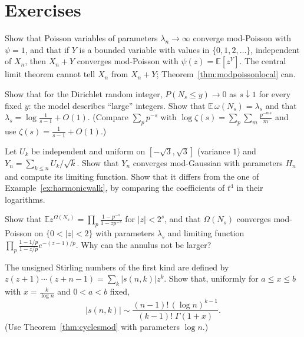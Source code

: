 \section{Exercises}

\begin{exercise}[$\star$]\label{ex:shift}
Show that Poisson variables of parameters $\lambda_n\to\infty$ converge mod-Poisson with $\psi=1$, and that if $Y$ is a bounded variable with values in $\{0,1,2,\dots\}$, independent of $X_n$, then $X_n+Y$ converges mod-Poisson with $\psi(z)=\mathbb E[z^Y]$.
The central limit theorem cannot tell $X_n$ from $X_n+Y$; Theorem~\ref{thm:modpoissonlocal} can.
\end{exercise}

\begin{exercise}[$\star$]\label{ex:lambdas}
Show that for the Dirichlet random integer, $P(N_s\le y)\to0$ as $s\downarrow1$ for every fixed $y$: the model describes ``large'' integers. Show that $\mathbb E\,\omega(N_s)=\lambda_s$ and that $\lambda_s=\log\frac1{s-1}+O(1)$. (Compare $\sum_pp^{-s}$ with
$\log\zeta(s)=\sum_p\sum_m\frac{p^{-ms}}m$ and use $\zeta(s)=\frac1{s-1}+O(1)$.)
\end{exercise}

\begin{exercise}[$\star\star$]\label{ex:residues}
Let $U_k$ be independent and uniform on $[-\sqrt3,\sqrt3]$ (variance $1$) and $Y_n=\sum_{k\le n}U_k/\sqrt k$. Show that $Y_n$ converges mod-Gaussian with parameters $H_n$ and compute its limiting function. Show that it differs from the one of
Example~\ref{ex:harmonicwalk}, by comparing the coefficients of $t^4$ in their logarithms.
\end{exercise}

\begin{exercise}[$\star\star$]\label{ex:bigomega}
Show that $\mathbb Ez^{\Omega(N_s)}=\prod_p\frac{1-p^{-s}}{1-zp^{-s}}$ for $|z|<2^s$, and that $\Omega(N_s)$ converges mod-Poisson on $\{0<|z|<2\}$ with parameters $\lambda_s$ and limiting function
$\prod_p\frac{1-1/p}{1-z/p}e^{-(z-1)/p}$. Why can the annulus not be larger?
\end{exercise}

\begin{exercise}[$\star\star$]\label{ex:stirling1}
The unsigned Stirling numbers of the first kind are defined by $z(z+1)\cdots(z+n-1)=\sum_k|s(n,k)|z^k$. Show that, uniformly for $a\le x\le b$ with $x=\frac k{\log n}$ and $0<a<b$ fixed,
\[
|s(n,k)|\sim\frac{(n-1)!\,(\log n)^{k-1}}{(k-1)!\;\Gamma(1+x)}.
\]
(Use Theorem~\ref{thm:cyclesmod} with parameters $\log n$.)
\end{exercise}

